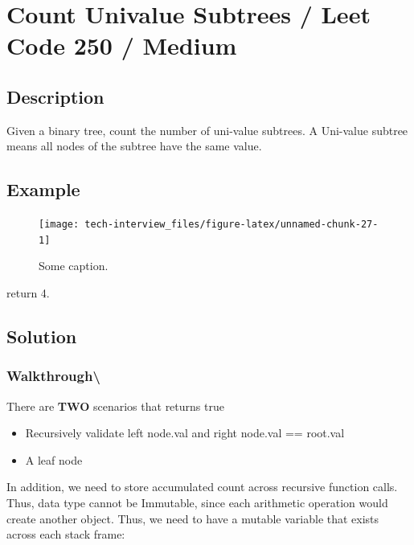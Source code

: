 \documentclass[]{book}
\providecommand{\tightlist}{%
  \setlength{\itemsep}{0pt}\setlength{\parskip}{0pt}}
\begin{document}
\hypertarget{count-univalue-subtrees-leet-code-250-medium}{%
\section{Count Univalue Subtrees / Leet Code 250 / Medium}\label{count-univalue-subtrees-leet-code-250-medium}}

\hypertarget{description-67}{%
\subsection{Description}\label{description-67}}

Given a binary tree, count the number of uni-value subtrees. A Uni-value subtree means all nodes of the
subtree have the same value.

\hypertarget{example-64}{%
\subsection{Example}\label{example-64}}

\begin{figure}
\texttt{[image: tech-interview\_files/figure-latex/unnamed-chunk-27-1]} \caption{Some caption.}\label{fig:unnamed-chunk-27}
\end{figure}

return 4.

\hypertarget{solution-45}{%
\subsection{Solution}\label{solution-45}}

\hypertarget{walkthrough-77}{%
\subsubsection{Walkthrough\textbackslash{}}\label{walkthrough-77}}

There are \textbf{TWO} scenarios that returns true

\begin{itemize}
\tightlist
\item
  Recursively validate left node.val and right node.val == root.val
\item
  A leaf node
\end{itemize}

In addition, we need to store accumulated count across recursive function calls. Thus, data type cannot be Immutable,
since each arithmetic operation would create another object. Thus, we need to have a mutable variable that exists
across each stack frame:
\end{document}
